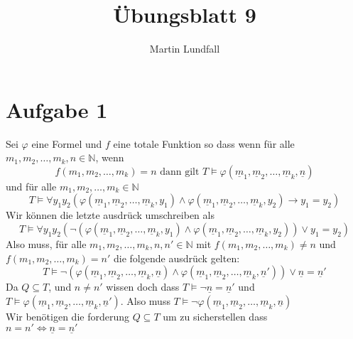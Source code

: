 \documentclass[12pt]{article}
\begin{document}
\title{Übungsblatt 9}
\author{Martin Lundfall}
\maketitle

\section*{Aufgabe 1}
Sei $\varphi$ eine Formel und $f$ eine totale Funktion so dass wenn für alle \\
$m_1, m_2, \dots, m_k, n \in \mathbb N$, wenn
\begin{equation}
 f(m_1, m_2, \dots, m_k) = n \mbox{ dann gilt } T \models \varphi(\underline m_1, \underline m_2, \dots, \underline m_k, \underline n)
\end{equation}
und für alle $m_1, m_2, \dots, m_k \in \mathbb N$ 
\begin{equation}
 T \models \forall y_1 y_2 \left ( \varphi(\underline m_1, \underline m_2, \dots, \underline m_k, y_1) \land \varphi(\underline m_1, \underline m_2, \dots, \underline m_k,  y_2) \rightarrow y_1 = y_2 \right )
\end{equation}
Wir können die letzte ausdrück umschreiben als
\begin{equation}
 T \models \forall y_1 y_2 \left (\neg (\varphi(\underline m_1, \underline m_2, \dots, \underline m_k, y_1) \land \varphi(\underline m_1, \underline m_2, \dots, \underline m_k,  y_2)) \lor y_1 = y_2 \right )
\end{equation}
Also muss, für alle $m_1, m_2, \dots, m_k, n, n' \in \mathbb N$ mit $f(m_1, m_2, \dots, m_k) \not= n$ und $f(m_1, m_2, \dots, m_k) = n'$ die folgende ausdrück gelten:
\begin{equation}
  T \models \neg (\varphi(\underline m_1, \underline m_2, \dots, \underline m_k, \underline n) \land \varphi(\underline m_1, \underline m_2, \dots, \underline m_k,  \underline n')) \lor \underline n = \underline n'
\end{equation}
Da $Q \subseteq T$, und $n \not = n'$ wissen doch dass $T \models \neg \underline n = \underline n'$ und $T \models  \varphi(\underline m_1, \underline m_2, \dots, \underline m_k,  \underline n')$. Also muss $T \models \neg \varphi(\underline m_1, \underline m_2, \dots, \underline m_k, \underline n)$\\
Wir benötigen die forderung $Q \subseteq T$ um zu sicherstellen dass \\
$n = n' \iff \underline n = \underline n'$
\end{document}
